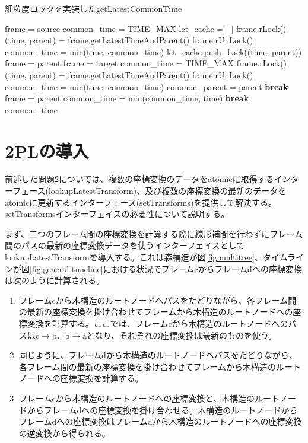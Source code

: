 \documentclass[a4paper]{jreport}	%
\begin{document}
\begin{algorithm}
\caption{細粒度ロックを実装したgetLatestCommonTime} \label{algo:getLatestCommonTime2}
\begin{algorithmic}[1]
	\State frame = source
	\State common\_time = TIME\_MAX
	\State lct\_cache = [ ] 
	\State frame.rLock()
	\State (time, parent) = frame.getLatestTimeAndParent()
	\State frame.rUnLock()
	\State common\_time = min(time, common\_time)
	\State lct\_cache.push\_back((time, parent))
	\State frame = parent
	\EndWhile
	\State frame = target
	\State common\_time = TIME\_MAX
	\State frame.rLock()
	\State (time, parent) = frame.getLatestTimeAndParent()
	\State frame.rUnLock()
	\State common\_time = min(time, common\_time)
	\State common\_parent = parent
	\State \textbf{break}
	\EndIf
	\State frame = parent
	\EndWhile
	\State common\_time = min(common\_time, time)
	\State \textbf{break}
	\EndIf
	\EndFor
	\State \Return common\_time
	\EndFunction
\end{algorithmic}
\end{algorithm}

\section{2PLの導入}
\label{section:intro-2pl}

前述した問題2については、複数の座標変換のデータをatomicに取得するインターフェース(lookupLatestTransform)、及び複数の座標変換の最新のデータをatomicに更新するインターフェース(setTransforms)を提供して解決する。setTransformsインターフェイスの必要性について説明する。

まず、二つのフレーム間の座標変換を計算する際に線形補間を行わずにフレーム間のパスの最新の座標変換データを使うインターフェイスとしてlookupLatestTransformを導入する。これは森構造が図\ref{fig:multitree}、タイムラインが図\ref{fig:general-timeline}における状況でフレームcからフレームdへの座標変換は次のように計算される。

\begin{enumerate}
	\item フレームcから木構造のルートノードへパスをたどりながら、各フレーム間の最新の座標変換を掛け合わせてフレームから木構造のルートノードへの座標変換を計算する。ここでは、フレームcから木構造のルートノードへのパスはc$\rightarrow$b、b$\rightarrow$aとなり、それぞれの座標変換は最新のものを使う。
	\item 同じように、フレームdから木構造のルートノードへパスをたどりながら、各フレーム間の最新の座標変換を掛け合わせてフレームから木構造のルートノードへの座標変換を計算する。
	\item フレームcから木構造のルートノードへの座標変換と、木構造のルートノードからフレームdへの座標変換を掛け合わせる。木構造のルートノードからフレームdへの座標変換はフレームdから木構造のルートノードへの座標変換の逆変換から得られる。
\end{enumerate}
\end{document}
